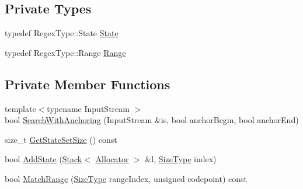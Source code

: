 \subsection*{Private Types}
\begin{DoxyCompactItemize}
\item 
typedef Regex\+Type\+::\+State \mbox{\hyperlink{classrapidjson_1_1internal_1_1_generic_regex_search_a81ada00d83141d17b9aba7c2caa48353}{State}}
\item 
typedef Regex\+Type\+::\+Range \mbox{\hyperlink{classrapidjson_1_1internal_1_1_generic_regex_search_a3bb3ee12c042b2266885a07226e3d6be}{Range}}
\end{DoxyCompactItemize}
\subsection*{Private Member Functions}
\begin{DoxyCompactItemize}
\item 
{\footnotesize template$<$typename Input\+Stream $>$ }\\bool \mbox{\hyperlink{classrapidjson_1_1internal_1_1_generic_regex_search_a29e3ab6d7d2666a7d30a9326a992e3ea}{Search\+With\+Anchoring}} (Input\+Stream \&is, bool anchor\+Begin, bool anchor\+End)
\item 
size\+\_\+t \mbox{\hyperlink{classrapidjson_1_1internal_1_1_generic_regex_search_a637af7f840c7550b52df24346c51cac4}{Get\+State\+Set\+Size}} () const
\item 
bool \mbox{\hyperlink{classrapidjson_1_1internal_1_1_generic_regex_search_a93bbf5cbe46e9fd9d9c3053a68b7b9e0}{Add\+State}} (\mbox{\hyperlink{classrapidjson_1_1internal_1_1_stack}{Stack}}$<$ \mbox{\hyperlink{classrapidjson_1_1_allocator}{Allocator}} $>$ \&l, \mbox{\hyperlink{namespacerapidjson_a44eb33eaa523e36d466b1ced64b85c84}{Size\+Type}} index)
\item 
bool \mbox{\hyperlink{classrapidjson_1_1internal_1_1_generic_regex_search_afa518b5ea6268d3ee71586142d03fec1}{Match\+Range}} (\mbox{\hyperlink{namespacerapidjson_a44eb33eaa523e36d466b1ced64b85c84}{Size\+Type}} range\+Index, unsigned codepoint) const
\end{DoxyCompactItemize}
